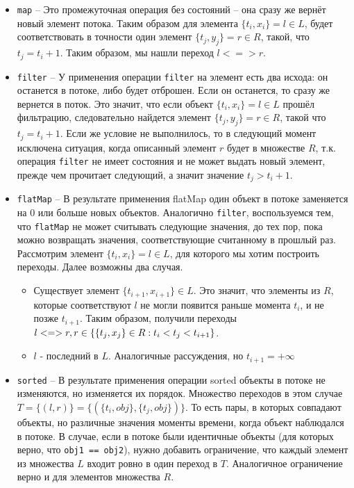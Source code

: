 \begin{itemize}
	\item \texttt{map} -- Это промежуточная операция без состояний -- она сразу же вернёт новый элемент потока. Таким образом для элемента $\{t_i, x_i\} = l \in L$, будет соответствовать в точности один элемент $\{t_j, y_j\} = r \in R$, такой, что $t_j = t_i + 1$. Таким образом, мы нашли переход $l <=> r$.
	\item \texttt{filter} -- У применения операции \texttt{filter} на элемент есть два исхода: он останется в потоке, либо будет отброшен. Если он останется, то сразу же вернется в поток. Это значит, что если объект $\{t_i, x_i\} = l \in L$ прошёл фильтрацию, следовательно найдется элемент $\{t_j, y_j\} = r \in R$, такой что $t_j = t_i + 1$. Если же условие не выполнилось, то в следующий момент исключена ситуация, когда описанный элемент $r$ будет в множестве $R$, т.к. операция \texttt{filter} не имеет состояния и не может выдать новый элемент, прежде чем прочитает следующий, а значит значение $t_j > t_i + 1$. 
	\item \texttt{flatMap} -- В результате применения flatMap один объект в потоке заменяется на 0 или больше новых объектов. Аналогично \texttt{filter}, воспользуемся тем, что \texttt{flatMap} не может считывать следующие значения, до тех пор, пока можно возвращать значения, соответствующие считанному в прошлый раз. Рассмотрим элемент $\{t_i, x_i\} = l \in L$, для которого мы хотим построить переходы. Далее возможны два случая.
	\begin{itemize}
		\item Существует элемент $\{t_{i + 1}, x_{i + 1}\} \in L$. Это значит, что элементы из $R$, которые соответствуют $l$ не могли появится раньше момента $t_i$, и не позже $t_{i + 1}$. Таким образом, получили переходы $l <=> r, \\ r \in \{\{t_j, x_j\} \in R : t_i < t_j < t_{i + 1}\}$.
		\item $l$ - последний в $L$. Аналогичные рассуждения, но $t_{i + 1} = +\infty$
	\end{itemize}
	\item \texttt{sorted} -- В результате применения операции sorted объекты в потоке не изменяются, но изменяется их порядок. Множество переходов в этом случае $T = \{(l, r)\} = \{(\{t_i, obj\}, \{t_j, obj\})\}$. То есть пары, в которых совпадают объекты, но различные значения моменты времени, когда объект наблюдался в потоке. В случае, если в потоке были идентичные объекты (для которых верно, что \texttt{obj1 == obj2}), нужно добавить ограничение, что каждый элемент из множества $L$ входит ровно в один переход в $T$. Аналогичное ограничение верно и для элементов множества $R$.
\end{itemize}

